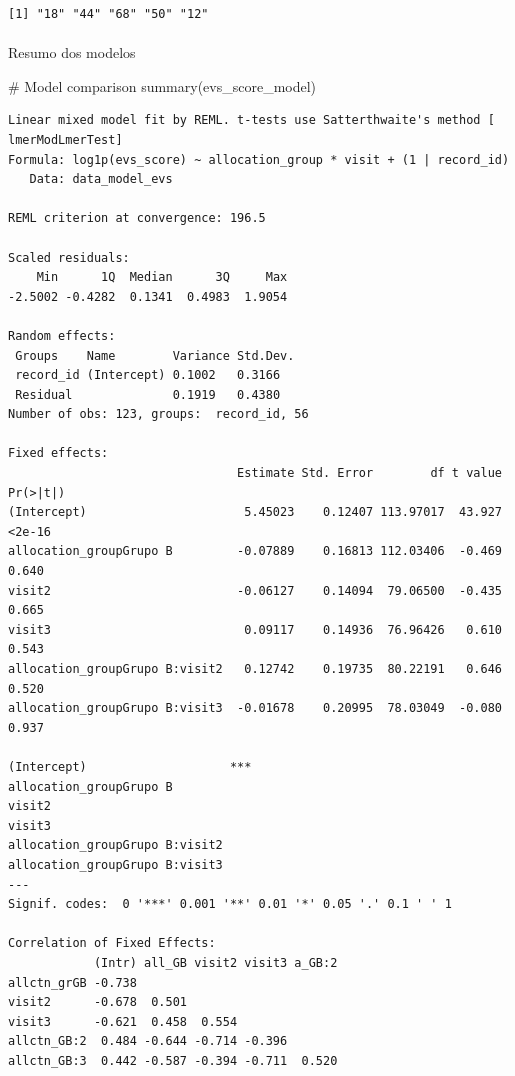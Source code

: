 \documentclass[
  letterpaper,
  DIV=11,
  numbers=noendperiod]{scrartcl}
\makeatletter
\let\oldparagraph\paragraph
\renewcommand{\paragraph}{
    \@ifstar
      \xxxParagraphStar
      \xxxParagraphNoStar
  }
\newcommand{\xxxParagraphStar}[1]{\oldparagraph*{#1}\mbox{}}
\newcommand{\xxxParagraphNoStar}[1]{\oldparagraph{#1}\mbox{}}
\newenvironment{Shaded}{\begin{snugshade}}{\end{snugshade}}
\newcommand{\CommentTok}[1]{\textcolor[rgb]{0.37,0.37,0.37}{#1}}
\newcommand{\FunctionTok}[1]{\textcolor[rgb]{0.28,0.35,0.67}{#1}}
\newcommand{\NormalTok}[1]{\textcolor[rgb]{0.00,0.23,0.31}{#1}}
\makeatother
\begin{document}
\begin{verbatim}
[1] "18" "44" "68" "50" "12"
\end{verbatim}

\paragraph{Resumo dos modelos}\label{resumo-dos-modelos-16}

\begin{Shaded}
\begin{Highlighting}[]
\CommentTok{\# Model comparison}
\FunctionTok{summary}\NormalTok{(evs\_score\_model)}
\end{Highlighting}
\end{Shaded}

\begin{verbatim}
Linear mixed model fit by REML. t-tests use Satterthwaite's method [
lmerModLmerTest]
Formula: log1p(evs_score) ~ allocation_group * visit + (1 | record_id)
   Data: data_model_evs

REML criterion at convergence: 196.5

Scaled residuals: 
    Min      1Q  Median      3Q     Max 
-2.5002 -0.4282  0.1341  0.4983  1.9054 

Random effects:
 Groups    Name        Variance Std.Dev.
 record_id (Intercept) 0.1002   0.3166  
 Residual              0.1919   0.4380  
Number of obs: 123, groups:  record_id, 56

Fixed effects:
                                Estimate Std. Error        df t value Pr(>|t|)
(Intercept)                      5.45023    0.12407 113.97017  43.927   <2e-16
allocation_groupGrupo B         -0.07889    0.16813 112.03406  -0.469    0.640
visit2                          -0.06127    0.14094  79.06500  -0.435    0.665
visit3                           0.09117    0.14936  76.96426   0.610    0.543
allocation_groupGrupo B:visit2   0.12742    0.19735  80.22191   0.646    0.520
allocation_groupGrupo B:visit3  -0.01678    0.20995  78.03049  -0.080    0.937
                                  
(Intercept)                    ***
allocation_groupGrupo B           
visit2                            
visit3                            
allocation_groupGrupo B:visit2    
allocation_groupGrupo B:visit3    
---
Signif. codes:  0 '***' 0.001 '**' 0.01 '*' 0.05 '.' 0.1 ' ' 1

Correlation of Fixed Effects:
            (Intr) all_GB visit2 visit3 a_GB:2
allctn_grGB -0.738                            
visit2      -0.678  0.501                     
visit3      -0.621  0.458  0.554              
allctn_GB:2  0.484 -0.644 -0.714 -0.396       
allctn_GB:3  0.442 -0.587 -0.394 -0.711  0.520
\end{verbatim}
\end{document}
